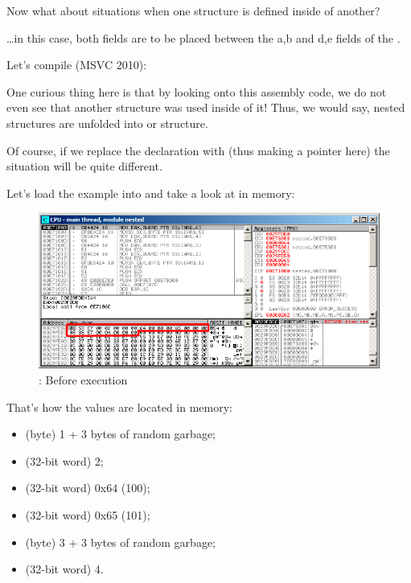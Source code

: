 
Now what about situations when one structure is defined inside of another?



\dots in this case, both  fields are to be placed between the a,b and d,e fields of
the .

Let's compile (MSVC 2010):



One curious thing here is that by looking onto this assembly code, we do not even see that
another structure was used inside of it!
Thus, we would say, nested structures are unfolded into  or  structure.

Of course, if we replace the  declaration with  
(thus making a pointer here) the situation will be quite different.

\clearpage
\subsectionold{\olly}
\myindex{\olly}

Let's load the example into \olly and take a look at 
 in memory:

\begin{figure}[H]
\centering
\includegraphics[scale=\FigScale]{patterns/15_structs/5_nested/olly.png}
\caption{\olly: Before \printf execution}
\label{fig:nested_olly}
\end{figure}

That's how the values are located in memory:
\begin{itemize}
\item {} (byte) 1 + 3 bytes of random garbage;
\item {} (32-bit word) 2;
\item {} (32-bit word) 0x64 (100);
\item {} (32-bit word) 0x65 (101);
\item {} (byte) 3 + 3 bytes of random garbage;
\item {} (32-bit word) 4.
\end{itemize}

